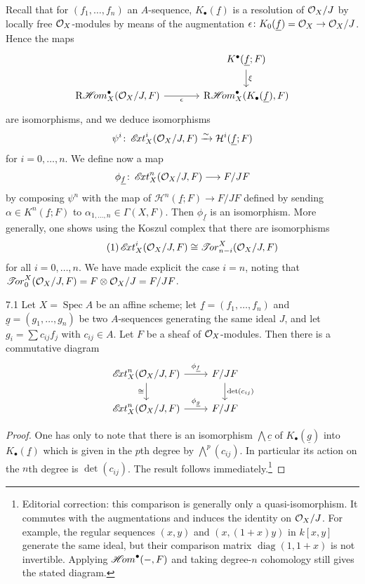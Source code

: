 Recall \cite[\nopp III,~1.1]{EGA} that for $(f_1,\dots,f_n)$ an $A$-sequence, $K_\bullet(\underline{f})$ is a resolution of $\mathcal{O}_X/J$ by locally free $\mathcal{O}_X$-modules by means of the augmentation $\epsilon\colon K_0(\underline{f})=\mathcal{O}_X\to\mathcal{O}_X/J$. Hence the maps
\[
\begin{tikzcd}[ampersand replacement=\&, column sep=large]
{} \& K^\bullet(\underline{f};F) \arrow[d, "\xi"] \\
\RsheafHom_X^\bullet(\sO_X/J,F) \arrow[r, "\epsilon"']
\& \RsheafHom_X^\bullet(K_\bullet(\underline{f}),F)
\end{tikzcd}
\]
are isomorphisms, and we deduce isomorphisms
\[
\psi^i\colon \mathop{\mathscr{E}\!xt}\nolimits_X^i(\mathcal{O}_X/J,F) \xrightarrow{\sim} \mathcal{H}^i(\underline{f};F)
\]
for $i=0,\dots,n$. We define now a map
\[
\phi_{\underline{f}} \colon \mathop{\mathscr{E}\!xt}\nolimits^n_X(\mathcal{O}_X/J,F) \longrightarrow F/JF
\]
by composing $\psi^n$ with the map of $\mathcal{H}^n(\underline{f};F)\to F/JF$ defined by sending $\alpha\in K^n(\underline{f};F)$ to $\alpha_{1,\dots,n}\in\Gamma(X,F)$. Then $\phi_{\underline{f}}$ is an isomorphism. More generally, one shows using the Koszul complex \cite[\nopp III,~1.1]{EGA} that there are isomorphisms
\begin{equation}\tag{1}\label{eq:3.7.1}
\mathop{\mathscr{E}\!xt}\nolimits^i_X(\mathcal{O}_X/J,F) \cong \mathop{\mathscr{T}\!or}\nolimits_{n-i}^X(\mathcal{O}_X/J,F)
\end{equation}
for all $i=0,\dots,n$. We have made explicit the case $i=n$, noting that $\mathop{\mathscr{T}\!or}\nolimits_0^X(\mathcal{O}_X/J,F)=F\otimes\mathcal{O}_X/J=F/JF$.

\begin{booklemma}{7.1}\label{lem:3.7.1}
Let $X=\operatorname{Spec}A$ be an affine scheme; let $\underline{f}=(f_1,\dots,f_n)$ and $\underline{g}=(g_1,\dots,g_n)$ be two $A$-sequences generating the same ideal $J$, and let $g_i=\sum c_{ij}f_j$ with $c_{ij}\in A$. Let $F$ be a sheaf of $\mathcal{O}_X$-modules. Then there is a commutative diagram
\[
\begin{tikzcd}
\sheafExt^n_X(\sO_X/J,F) \arrow[r, "\phi_{\underline{f}}"] \arrow[d, "\cong"'] & F/JF \arrow[d, "\det(c_{ij})"] \\
\sheafExt^n_X(\sO_X/J,F) \arrow[r, "\phi_{\underline{g}}"] & F/JF
\end{tikzcd}
\]
\end{booklemma}

\begin{proof}
One has only to note that there is an isomorphism $\bigwedge\underline{c}$ of $K_\bullet(\underline{g})$ into $K_\bullet(\underline{f})$ which is given in the $p$th degree by $\bigwedge^p(c_{ij})$. In particular its action on the $n$th degree is $\det(c_{ij})$. The result follows immediately.\footnote{Editorial correction: this comparison is generally only a quasi-isomorphism. It commutes with the augmentations and induces the identity on $\mathcal{O}_X/J$. For example, the regular sequences $(x,y)$ and $(x,(1+x)y)$ in $k[x,y]$ generate the same ideal, but their comparison matrix $\operatorname{diag}(1,1+x)$ is not invertible. Applying $\mathop{\mathscr{H}\!om}\nolimits^\bullet(-,F)$ and taking degree-$n$ cohomology still gives the stated diagram.}
\end{proof}

